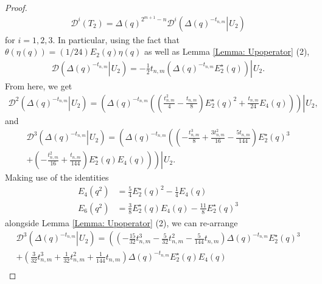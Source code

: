 \documentclass[10pt,a4paper]{amsart}
\newcommand{\utwo}[1]{\left. #1 \right\rvert \hspace{1pt} U_{2}}
\begin{document}
\begin{proof}
   \begin{align*}
       \mathcal{D}^{i}(T_{2}) = \Delta (q)^{2^{m+1}-n} \mathcal{D}^{i} \left( \utwo{  \Delta (q)^{-t_{n,m}} } \right)
   \end{align*}
   for $i = 1,2,3$. In particular, using the fact that $\theta (\eta (q)) = (1/24) E_{2}(q) \eta (q)$ as well as Lemma \ref{Lemma: Upoperator} (2),
   \begin{align}
        \mathcal{D} \left. \left( \Delta (q)^{-t_{n,m}} \right\rvert \hspace{1pt} U_{2} \right) = - \frac{1}{2} t_{n,m} \utwo{ \left( \Delta (q)^{- t_{n,m}} E_{2}^{\star}(q) \right) }. \label{T2d1}
   \end{align}
   From here, we get
   \begin{align*}
       \mathcal{D}^{2} \left( \utwo{ \Delta (q)^{-t_{n,m}} } \right) = \utwo{ \left( \Delta (q)^{-t_{n,m}} \left( \left( \frac{ t_{n,m}^{2}}{4} - \frac{ t_{n,m}}{8} \right) E_{2}^{\star}(q)^{2} + \frac{ t_{n,m}}{24} E_{4}(q) \right) \right) },
   \end{align*}
   and 
   \begin{multline*}
       \mathcal{D}^{3} \left( \utwo{ \Delta (q)^{- t_{n,m}} } \right) = \left. \left( \Delta (q)^{- t_{n,m}} \left( \left( - \frac{t_{n,m}^{3}}{8} + \frac{3 t_{n,m}^{2}}{16} - \frac{5 t_{n,m}}{144} \right) E_{2}^{\star}(q)^{3} \right.\right. \right. \\
       + \utwo{ \left. \left. \left( - \frac{t_{n,m}^{2}}{16} + \frac{t_{n,m}}{144} \right) E_{2}^{\star}(q) E_{4}(q) \right) \right) }.
   \end{multline*}
   Making use of the identities
       \begin{align*}
           E_{4}(q^{2}) &= \frac{5}{4} E_{2}^{\star}(q)^{2} - \frac{1}{4} E_{4}(q) \\
           E_{6}(q^{2}) &= \frac{3}{8}E_{2}^{\star}(q)E_{4}(q) - \frac{11}{8}E_{2}^{\star}(q)^{3}
       \end{align*}
   alongside Lemma \ref{Lemma: Upoperator} (2), we can re-arrange
   \begin{multline*}
           \mathcal{D}^{3} \left( \utwo{ \Delta (q)^{-t_{n,m}} } \right) = \left. \left( \left( - \frac{15}{32} t_{n,m}^{3} - \frac{5}{32} t_{n,m}^{2} - \frac{5}{144} t_{n,m} \right) \Delta (q)^{-t_{n,m}}E_{2}^{\star}(q)^{3} \right. \right. \\ 
           \left. \left. + \left( \frac{3}{32} t_{n,m}^{3} + \frac{1}{32} t_{n,m}^{2} + \frac{1}{144} t_{n,m} \right) \Delta (q)^{- t_{n,m}} E_{2}^{\star}(q)E_{4}(q) \right. \right. \\

\end{multline*}
\end{proof}
\end{document}
